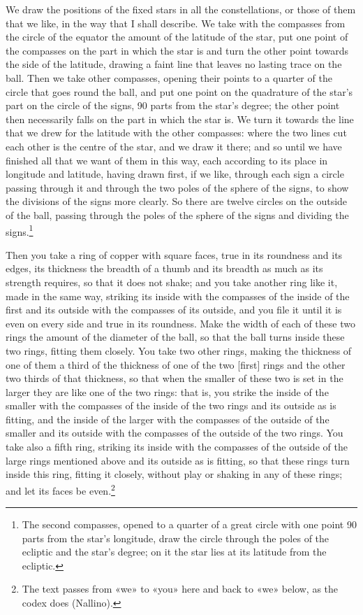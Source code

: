 \documentclass[11pt]{article}
\begin{document}
\par We draw the positions of the fixed stars in all the constellations, or those of them that we like, in the way that I shall describe. We take with the compasses from the circle of the equator the amount of the latitude of the star, put one point of the compasses on the part in which the star is and turn the other point towards the side of the latitude, drawing a faint line that leaves no lasting trace on the ball. Then we take other compasses, opening their points to a quarter of the circle that goes round the ball, and put one point on the quadrature of the star's part on the circle of the signs, 90 parts from the star's degree; the other point then necessarily falls on the part in which the star is. We turn it towards the line that we drew for the latitude with the other compasses: where the two lines cut each other is the centre of the star, and we draw it there; and so until we have finished all that we want of them in this way, each according to its place in longitude and latitude, having drawn first, if we like, through each sign a circle passing through it and through the two poles of the sphere of the signs, to show the divisions of the signs more clearly. So there are twelve circles on the outside of the ball, passing through the poles of the sphere of the signs and dividing the signs.\footnote{The second compasses, opened to a quarter of a great circle with one point 90 parts from the star's longitude, draw the circle through the poles of the ecliptic and the star's degree; on it the star lies at its latitude from the ecliptic.}\par
\par Then you take a ring of copper with square faces, true in its roundness and its edges, its thickness the breadth of a thumb and its breadth as much as its strength requires, so that it does not shake; and you take another ring like it, made in the same way, striking its inside with the compasses of the inside of the first and its outside with the compasses of its outside, and you file it until it is even on every side and true in its roundness. Make the width of each of these two rings the amount of the diameter of the ball, so that the ball turns inside these two rings, fitting them closely. You take two other rings, making the thickness of one of them a third of the thickness of one of the two [first] rings and the other two thirds of that thickness, so that when the smaller of these two is set in the larger they are like one of the two rings: that is, you strike the inside of the smaller with the compasses of the inside of the two rings and its outside as is fitting, and the inside of the larger with the compasses of the outside of the smaller and its outside with the compasses of the outside of the two rings. You take also a fifth ring, striking its inside with the compasses of the outside of the large rings mentioned above and its outside as is fitting, so that these rings turn inside this ring, fitting it closely, without play or shaking in any of these rings; and let its faces be even.\footnote{The text passes from «we» to «you» here and back to «we» below, as the codex does (Nallino).}\par
\end{document}
